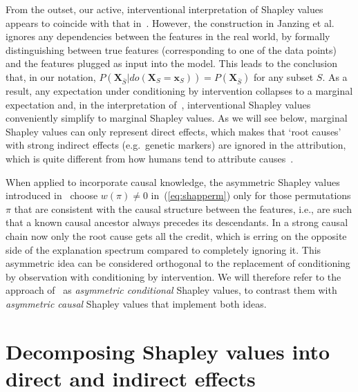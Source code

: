 \documentclass{article}
\newcommand{\vX}{\mathbf{X}}
\newcommand{\vx}{\mathbf{x}}
\newcommand{\dodo}{\mathit{do}}
\newcommand{\lvdo}[1]{\dodo(\vX_{#1} = \vx_{#1})}
\newcommand{\perm}{\pi}
\begin{document}
From the outset, our active, interventional interpretation of Shapley values appears to coincide with that in~\cite{datta2016algorithmic,janzing2019feature,lundberg2020local}. However, the construction in Janzing et al.~\cite{janzing2019feature} ignores any dependencies between the features in the real world, by formally distinguishing between true features (corresponding to one of the data points) and the features plugged as input into the model. This leads to the conclusion that, in our notation, $P(\vX_{\bar{S}}|\lvdo{S}) = P(\vX_{\bar{S}})$ for any subset $S$. As a result, any expectation under conditioning by intervention collapses to a marginal expectation and, in the interpretation of~\cite{datta2016algorithmic,janzing2019feature,lundberg2020local}, interventional Shapley values conveniently simplify to marginal Shapley values. As we will see below, marginal Shapley values can only represent direct effects, which makes that `root causes' with strong indirect effects (e.g.\ genetic markers) are ignored in the attribution, which is quite different from how humans tend to attribute causes~\cite{sober1988apportioning}.

When applied to incorporate causal knowledge, the asymmetric Shapley values introduced in~\cite{frye2019asymmetric} choose $w(\perm) \neq 0$ in~(\ref{eq:shapperm}) only for those permutations $\perm$ that are consistent with the causal structure between the features, i.e., are such that a known causal ancestor always precedes its descendants. In a strong causal chain now only the root cause gets all the credit, which is erring on the opposite side of the explanation spectrum compared to completely ignoring it.
This asymmetric idea can be considered orthogonal to the replacement of conditioning by observation with conditioning by intervention. We will therefore refer to the approach of~\cite{frye2019asymmetric} as {\em asymmetric conditional} Shapley values, to contrast them with {\em asymmetric causal} Shapley values that implement both ideas.

\section{Decomposing Shapley values into direct and indirect effects}
\end{document}
